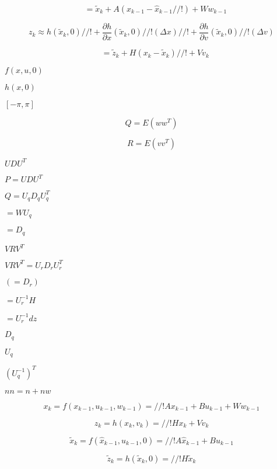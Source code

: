 \documentclass{article}
\begin{document}
\[ \phantom{x_k} = \tilde{x}_k + A \left( x_{k-1} - \hat{x}_{k-1} //! \right) + W w_{k-1} \]
\pagebreak

\[ z_k \approx h \left( \tilde{x}_k, 0 \right) //! + \frac{\partial h}{\partial x} \left( \tilde{x}_k, 0 \right) //! \left( \Delta x \right) //! + \frac{\partial h}{\partial v} \left( \tilde{x}_k, 0 \right) //! \left( \Delta v \right) \]
\pagebreak

\[ \phantom{z_k} = \tilde{z}_k + H \left( x_k - \tilde{x}_k \right) //! + V v_k \]
\pagebreak

$ f(x, u, 0) $
\pagebreak

$ h(x, 0) $
\pagebreak

$ [-\pi, \pi] $
\pagebreak

\[ Q = E\left( w w^T \right) \]
\pagebreak

\[ R = E\left( v v^T \right) \]
\pagebreak

$ U D U^T $
\pagebreak

$ P = U D U^T $
\pagebreak

$ Q = U_q D_q U_q^T $
\pagebreak

$ = W U_q $
\pagebreak

$ = D_q $
\pagebreak

$ V R V^T $
\pagebreak

$ V R V^T = U_r D_r U_r^T $
\pagebreak

$ ( = D_r ) $
\pagebreak

$ = U_r^{-1} H $
\pagebreak

$ = U_r^{-1} dz $
\pagebreak

$ D_q $
\pagebreak

$ U_q $
\pagebreak

$ \left( U_q^{-1} \right)^T $
\pagebreak

$ nn = n + nw $
\pagebreak

\[ x_k = f \left( x_{k-1}, u_{k-1}, w_{k-1} \right) = //! A x_{k-1} + B u_{k-1} + W w_{k-1} \]
\pagebreak

\[ z_k = h \left( x_k, v_k \right) = //! H x_k + V v_k \]
\pagebreak

\[ \tilde{x}_k = f \left( \hat{x}_{k-1}, u_{k-1}, 0 \right) = //! A \hat{x}_{k-1} + B u_{k-1} \]
\pagebreak

\[ \tilde{z}_k = h \left( \tilde{x}_k, 0 \right) = //! H \tilde{x}_k \]
\pagebreak
\end{document}
